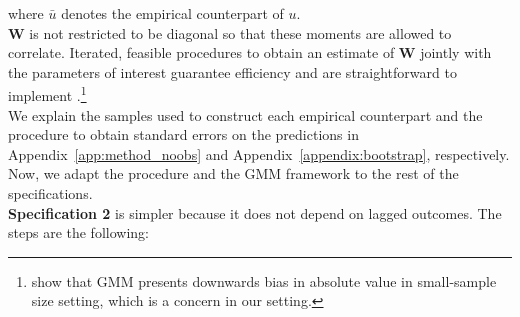 \noindent where $\bar{u}$ denotes the empirical counterpart of $u$.\\

\noindent $\bm{W}$ is not restricted to be diagonal so that these moments are allowed to correlate. Iterated, feasible procedures to obtain an estimate of $\bm{W}$ jointly with the parameters of interest guarantee efficiency and are straightforward to implement \citep{Hansen_1982_Econometrica,Amemiya_1985_advanced}.\footnote{\citet{Altonji_Segal_1996_JoBaES} show that GMM presents downwards bias in absolute value in small-sample size setting, which is a concern in our setting.}\\

\noindent We explain the samples used to construct each empirical counterpart and the procedure to obtain standard errors on the predictions in Appendix~\ref{app:method_noobs} and Appendix~\ref{appendix:bootstrap}, respectively.\\

\noindent Now, we adapt the procedure and the GMM framework to the rest of the specifications.\\

\noindent \textbf{Specification 2} is simpler because it does not depend on lagged outcomes. The steps are the following:


